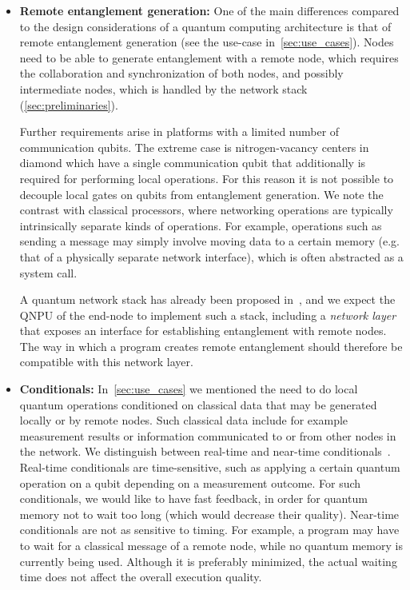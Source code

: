 \begin{itemize}
      \item \label{item:design_ent_gen} \textbf{Remote entanglement generation:}
            One of the main differences compared to the design considerations of a quantum computing architecture is that of remote entanglement
            generation (see the use-case in~\cref{sec:use_cases}).
            Nodes need to be able to generate entanglement with a remote node, which requires the collaboration and synchronization of both nodes, and possibly intermediate nodes, which is handled by the network stack (\cref{sec:preliminaries}).

            Further requirements arise in platforms with a limited number of communication qubits.
            The extreme case is nitrogen-vacancy centers in diamond which have a single communication qubit that additionally is required for performing local operations.
            For this reason it is not possible to decouple local gates on qubits from entanglement
            generation.
            We note the contrast with classical processors, where networking operations are typically intrinsically separate kinds of operations.
            For example, operations such as sending a message may simply involve moving data to a certain memory (e.g. that of a physically separate network interface), which is often abstracted as a system call.

            A quantum network stack has already been proposed in~\cite{dahlberg2019linklayer,kozlowski2020networklayer}, and we expect the \ac{QNPU} of the end-node to implement such a stack, including a \textit{network layer} that exposes an interface for establishing entanglement with remote nodes.
            The way in which a program creates remote entanglement should therefore be compatible with this network layer.

      \item \label{item:design_cond} \textbf{Conditionals:}
            In~\cref{sec:use_cases} we mentioned the need to do local quantum operations conditioned on classical data that may be generated locally or by remote nodes. Such classical data include for example measurement results or information communicated to or from other nodes in the network.
            We distinguish between real-time and near-time conditionals~\cite{cross2021openqasm}.
            Real-time conditionals are time-sensitive, such as applying a certain quantum operation on a qubit depending on a measurement outcome.
            For such conditionals, we would like to have fast feedback, in order for quantum memory not to wait too long (which would decrease their quality).
            Near-time conditionals are not as sensitive to timing.
            For example, a program may have to wait for a classical message of a remote node, while no quantum memory is currently being used.
            Although it is preferably minimized, the actual waiting time does not affect the overall execution quality.



\end{itemize}
